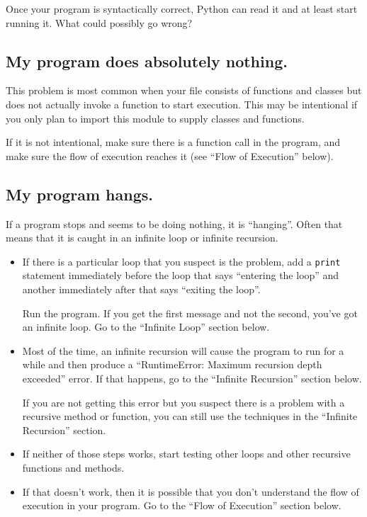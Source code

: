 Once your program is syntactically correct,
Python can read it and at least start running it.  What could
possibly go wrong?


\subsection{My program does absolutely nothing.}

This problem is most common when your file consists of functions and
classes but does not actually invoke a function to start execution.
This may be intentional if you only plan to import this module to
supply classes and functions.

If it is not intentional, make sure there is a function call
in the program, and make sure the flow of execution reaches
it (see ``Flow of Execution'' below).


\subsection{My program hangs.}

If a program stops and seems to be doing nothing, it is ``hanging''.
Often that means that it is caught in an infinite loop or infinite
recursion.

\begin{itemize}

\item If there is a particular loop that you suspect is the
problem, add a {\tt print} statement immediately before the loop that says
``entering the loop'' and another immediately after that says
``exiting the loop''.

Run the program.  If you get the first message and not the second,
you've got an infinite loop.  Go to the ``Infinite Loop'' section
below.

\item Most of the time, an infinite recursion will cause the program
to run for a while and then produce a ``RuntimeError: Maximum
recursion depth exceeded'' error.  If that happens, go to the
``Infinite Recursion'' section below.

If you are not getting this error but you suspect there is a problem
with a recursive method or function, you can still use the techniques
in the ``Infinite Recursion'' section.

\item If neither of those steps works, start testing other
loops and other recursive functions and methods.

\item If that doesn't work, then it is possible that
you don't understand the flow of execution in your program.
Go to the ``Flow of Execution'' section below.

\end{itemize}


